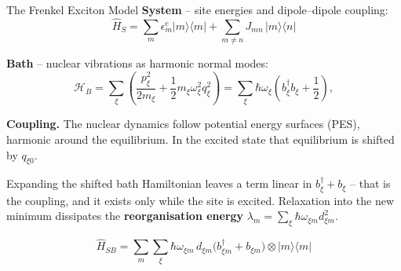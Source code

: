 \begin{frame}[t]{}
\begin{postercolumn}
\begin{block}{The Frenkel Exciton Model}
    \textbf{System} -- site energies and dipole--dipole coupling:
    \[ \hat H_S = \sum_m \epsilon^e_m |m\rangle\langle m|
                + \sum_{m\neq n} J_{mn}\,|m\rangle\langle n| \]

    \textbf{Bath} -- nuclear vibrations as harmonic normal modes:
    \[ \mathcal{H}_B = \sum_\xi \left( \frac{p_\xi^2}{2m_\xi} + 
    \frac{1}{2}m_\xi \omega_\xi^2 q_\xi^2 \right) = \sum_\xi \hbar\omega_\xi \left( b_\xi^\dagger b_\xi + 
    \frac{1}{2} \right), \]

    \begin{minipage}[t]{0.55\linewidth}
      \textbf{Coupling.} The nuclear dynamics follow potential energy
      surfaces (PES), harmonic around the equilibrium. In the excited state
      that equilibrium is shifted by $q_{\xi 0}$.
      \smallskip

      Expanding the shifted bath Hamiltonian leaves a term linear in
      $b^\dagger_\xi + b_\xi$ -- that is the coupling, and it exists only
      while the site is excited. Relaxation into the new minimum dissipates
      the \textbf{reorganisation energy}
      $\lambda_m=\sum_\xi \hbar\omega_{\xi m}d^2_{\xi m}$.
    \end{minipage}\hfill
    \begin{minipage}[t]{0.42\linewidth}
      \vspace{0pt}
    \end{minipage}\par

    \bigskip
    \bigskip
    \bigskip

    \[ \hat H_{SB} = \sum_{m}\sum_\xi \hbar\omega_{\xi m}\, d_{\xi m}
          \big( b^\dagger_{\xi m} + b_{\xi m}\big)\otimes|m\rangle\langle m| \]

  \end{block}%
\end{postercolumn}\hspace{\colsep}%
\begin{postercolumn}


\end{postercolumn}
\end{frame}
